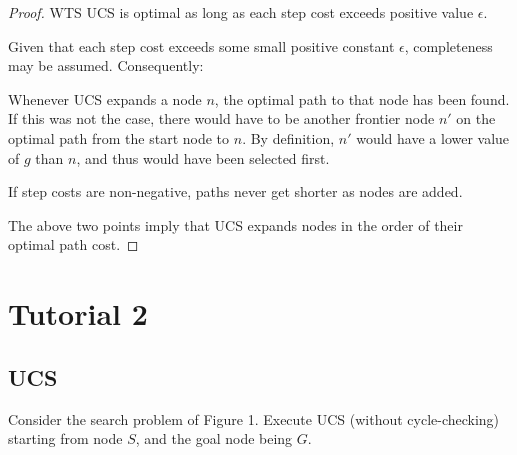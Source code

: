 \begin{enumerate}
    \begin{solution}
        \begin{proof}
            WTS UCS is optimal as long as each step cost exceeds positive value $\epsilon$.

            Given that each step cost exceeds some small positive constant $\epsilon$, completeness may be assumed. Consequently:

            \begin{listu}
                \item Whenever UCS expands a node $n$, the optimal path to that node has been found. If this was not the case, there would have to be another frontier node $n'$ on the optimal path from the start node to $n$. By definition, $n'$ would have a lower value of $g$ than $n$, and thus would have been selected first.

                \item If step costs are non-negative, paths never get shorter as nodes are added.
            \end{listu}

            The above two points imply that UCS expands nodes in the order of their optimal path cost.
        \end{proof}
    \end{solution}
\end{enumerate}

\newpage
\section*{Tutorial 2}

\subsection*{UCS}

Consider the search problem of Figure 1. Execute UCS (without cycle-checking) starting from node $S$, and the goal node being $G$.

